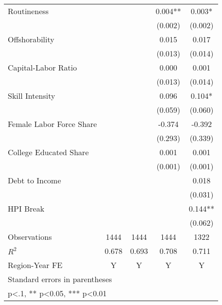 \begin{table}[htbp]
\begin{tabular}{l*{4}{c}}
\addlinespace
Routineness         &            &            &    0.004** &    0.003*  \\
                    &            &            &  (0.002)   &  (0.002)   \\
\addlinespace
Offshorability      &            &            &    0.015   &    0.017   \\
                    &            &            &  (0.013)   &  (0.014)   \\
\addlinespace
Capital-Labor Ratio &            &            &    0.000   &    0.001   \\
                    &            &            &  (0.013)   &  (0.014)   \\
\addlinespace
Skill Intensity     &            &            &    0.096   &    0.104*  \\
                    &            &            &  (0.059)   &  (0.060)   \\
\addlinespace
Female Labor Force Share&            &            &   -0.374   &   -0.392   \\
                    &            &            &  (0.293)   &  (0.339)   \\
\addlinespace
College Educated Share&            &            &    0.001   &    0.001   \\
                    &            &            &  (0.001)   &  (0.001)   \\
\addlinespace
Debt to Income      &            &            &            &    0.018   \\
                    &            &            &            &  (0.031)   \\
\addlinespace
HPI Break           &            &            &            &    0.144** \\
                    &            &            &            &  (0.062)   \\
\midrule
Observations        &     1444   &     1444   &     1444   &     1322   \\
\(R^{2}\)           &    0.678   &    0.693   &    0.708   &    0.711   \\
Region-Year FE      &        Y   &        Y   &        Y   &        Y   \\
\bottomrule
\multicolumn{5}{l}{\footnotesize Standard errors in parentheses}\\
\multicolumn{5}{l}{\footnotesize * p<.1, ** p<0.05, *** p<0.01}\\
\end{tabular}
\end{table}
